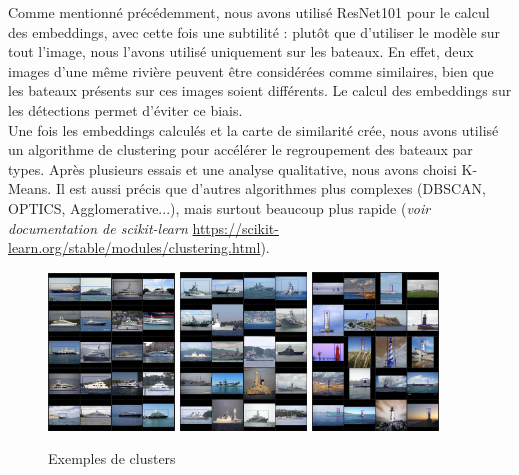 Comme mentionné précédemment, nous avons utilisé ResNet101 pour le calcul des embeddings, 
avec cette fois une subtilité : plutôt que d'utiliser le modèle sur tout l'image, nous 
l'avons utilisé uniquement sur les bateaux. En effet, deux images d'une même rivière 
peuvent être considérées comme similaires, bien que les bateaux présents sur ces images 
soient différents. Le calcul des embeddings sur les détections permet d'éviter ce biais.\\

Une fois les embeddings calculés et la carte de similarité crée, nous avons utilisé un algorithme 
de clustering pour accélérer le regroupement des bateaux par types. Après plusieurs essais et une analyse 
qualitative, nous avons choisi K-Means. Il est aussi précis que d'autres algorithmes plus complexes (DBSCAN, 
OPTICS, Agglomerative...), mais surtout beaucoup plus rapide (\textit{voir documentation 
de scikit-learn }\url{https://scikit-learn.org/stable/modules/clustering.html}). 

\begin{figure}[H]
    \centering
    \includegraphics[width=0.3\textwidth]{./img/yachts.png}
    \includegraphics[width=0.3\textwidth]{./img/warships.png}
    \includegraphics[width=0.3\textwidth]{./img/lighthouses.png}
    \caption{Exemples de clusters}
\end{figure}

